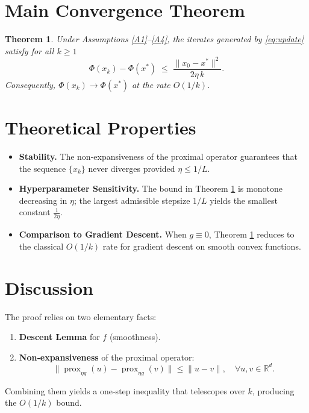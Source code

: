 \documentclass{article}
\newtheorem{theorem}{Theorem}
\begin{document}
\section*{Main Convergence Theorem}
\begin{theorem}
\label{thm:rate}
Under Assumptions \ref{A1}–\ref{A4}, the iterates generated by \eqref{eq:update} satisfy for all $k\ge 1$
\[
\Phi(x_{k})-\Phi(x^{*})\;\le\;\frac{\|x_{0}-x^{*}\|^{2}}{2\eta\,k}.
\]
Consequently, $\Phi(x_{k})\to\Phi(x^{*})$ at the rate $O(1/k)$.
\end{theorem}

\section*{Theoretical Properties}
\begin{itemize}
  \item \textbf{Stability.} The non‑expansiveness of the proximal operator guarantees that the sequence $\{x_{k}\}$ never diverges provided $\eta\le1/L$.
  \item \textbf{Hyperparameter Sensitivity.} The bound in Theorem \ref{thm:rate} is monotone decreasing in $\eta$; the largest admissible stepsize $1/L$ yields the smallest constant $\frac{1}{2\eta}$.
  \item \textbf{Comparison to Gradient Descent.} When $g\equiv0$, Theorem \ref{thm:rate} reduces to the classical $O(1/k)$ rate for gradient descent on smooth convex functions.
\end{itemize}

\section*{Discussion}
The proof relies on two elementary facts:
\begin{enumerate}
  \item \textbf{Descent Lemma} for $f$ (smoothness).
  \item \textbf{Non‑expansiveness} of the proximal operator:
        \[
        \|\operatorname{prox}_{\eta g}(u)-\operatorname{prox}_{\eta g}(v)\|\le\|u-v\|,
        \quad\forall u,v\in\mathbb{R}^{d}.
        \]
\end{enumerate}
Combining them yields a one‑step inequality that telescopes over $k$, producing the $O(1/k)$ bound.

\newpage
\end{document}
